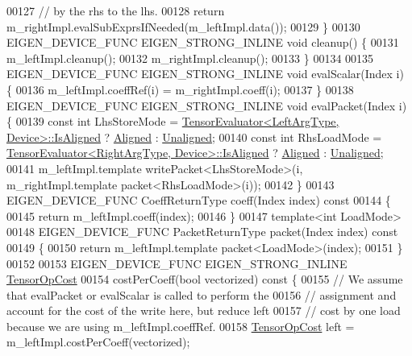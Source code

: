 \begin{DoxyCode}
00127     \textcolor{comment}{// by the rhs to the lhs.}
00128     \textcolor{keywordflow}{return} m\_rightImpl.evalSubExprsIfNeeded(m\_leftImpl.data());
00129   \}
00130   EIGEN\_DEVICE\_FUNC EIGEN\_STRONG\_INLINE \textcolor{keywordtype}{void} cleanup() \{
00131     m\_leftImpl.cleanup();
00132     m\_rightImpl.cleanup();
00133   \}
00134 
00135   EIGEN\_DEVICE\_FUNC EIGEN\_STRONG\_INLINE \textcolor{keywordtype}{void} evalScalar(Index i) \{
00136     m\_leftImpl.coeffRef(i) = m\_rightImpl.coeff(i);
00137   \}
00138   EIGEN\_DEVICE\_FUNC EIGEN\_STRONG\_INLINE \textcolor{keywordtype}{void} evalPacket(Index i) \{
00139     \textcolor{keyword}{const} \textcolor{keywordtype}{int} LhsStoreMode = \hyperlink{struct_eigen_1_1_tensor_evaluator}{TensorEvaluator<LeftArgType, Device>::IsAligned}
       ? \hyperlink{group__enums_gga45fe06e29902b7a2773de05ba27b47a1ad37d4c71425bb286e9b4103830538fbf}{Aligned} : \hyperlink{group__enums_gga45fe06e29902b7a2773de05ba27b47a1ac935220b4c844108e183ebe30a4d5204}{Unaligned};
00140     \textcolor{keyword}{const} \textcolor{keywordtype}{int} RhsLoadMode = \hyperlink{struct_eigen_1_1_tensor_evaluator}{TensorEvaluator<RightArgType, Device>::IsAligned}
       ? \hyperlink{group__enums_gga45fe06e29902b7a2773de05ba27b47a1ad37d4c71425bb286e9b4103830538fbf}{Aligned} : \hyperlink{group__enums_gga45fe06e29902b7a2773de05ba27b47a1ac935220b4c844108e183ebe30a4d5204}{Unaligned};
00141     m\_leftImpl.template writePacket<LhsStoreMode>(i, m\_rightImpl.template packet<RhsLoadMode>(i));
00142   \}
00143   EIGEN\_DEVICE\_FUNC CoeffReturnType coeff(Index index)\textcolor{keyword}{ const}
00144 \textcolor{keyword}{  }\{
00145     \textcolor{keywordflow}{return} m\_leftImpl.coeff(index);
00146   \}
00147   \textcolor{keyword}{template}<\textcolor{keywordtype}{int} LoadMode>
00148   EIGEN\_DEVICE\_FUNC PacketReturnType packet(Index index)\textcolor{keyword}{ const}
00149 \textcolor{keyword}{  }\{
00150     \textcolor{keywordflow}{return} m\_leftImpl.template packet<LoadMode>(index);
00151   \}
00152 
00153   EIGEN\_DEVICE\_FUNC EIGEN\_STRONG\_INLINE \hyperlink{class_eigen_1_1_tensor_op_cost}{TensorOpCost}
00154   costPerCoeff(\textcolor{keywordtype}{bool} vectorized)\textcolor{keyword}{ const }\{
00155     \textcolor{comment}{// We assume that evalPacket or evalScalar is called to perform the}
00156     \textcolor{comment}{// assignment and account for the cost of the write here, but reduce left}
00157     \textcolor{comment}{// cost by one load because we are using m\_leftImpl.coeffRef.}
00158     \hyperlink{class_eigen_1_1_tensor_op_cost}{TensorOpCost} left = m\_leftImpl.costPerCoeff(vectorized);

\end{DoxyCode}
